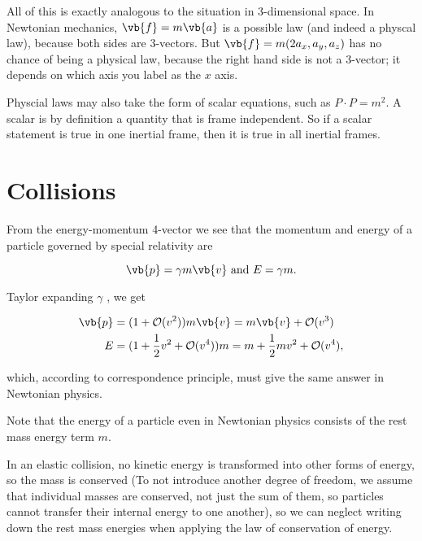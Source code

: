 \documentclass[english,a4paper,12pt]{report}
\begin{document}
All of this is exactly analogous to the situation in 3-dimensional space. In Newtonian mechanics, \(\vb{f}  = m\vb{a} \) is a possible law (and indeed a physcal law), because both sides are 3-vectors. But \(\vb{f} = m(2a_{x}, a_{y},a_{z})\) has no chance of being a physical law, because the right hand side is not a 3-vector; it depends on which axis you label as the \(x\) axis.

Physcial laws may also take the form of scalar equations, such as \(P \cdot P = m^2\). A scalar is by definition a quantity that is frame independent. So if a scalar statement is true in one inertial frame, then it is true in all inertial frames.  

\section{Collisions}

From the energy-momentum 4-vector we see that the momentum and energy of a particle governed by special relativity are

\begin{equation}
    \vb{p}  = \gamma m\vb{v} \text { and } E = \gamma m.
\end{equation}

Taylor expanding \(\gamma \) , we get

\begin{equation}
    \begin{aligned}
    \vb{p} &= (1 + \mathcal{O}(v^2)) m\vb{v} = m\vb{v} + \mathcal{O}(v^3 ) \\
    E &= (1 + \frac{1}{2}v^2 + \mathcal{O}(v^{4} ) ) m = m + \frac{1}{2}mv^2 + \mathcal{O}(v^{4} ), 
    \end{aligned}
\end{equation}

which, according to correspondence principle, must give the same answer in Newtonian physics. 

Note that the energy of a particle even in Newtonian physics consists of the rest mass energy term \(m\).  

In an elastic collision, no kinetic energy is transformed into other forms of energy, so the mass is conserved (To not introduce another degree of freedom, we assume that individual masses are conserved, not just the sum of them, so particles cannot transfer their internal energy to one another), so we can neglect writing down the rest mass energies when applying the law of conservation of energy.
\end{document}
